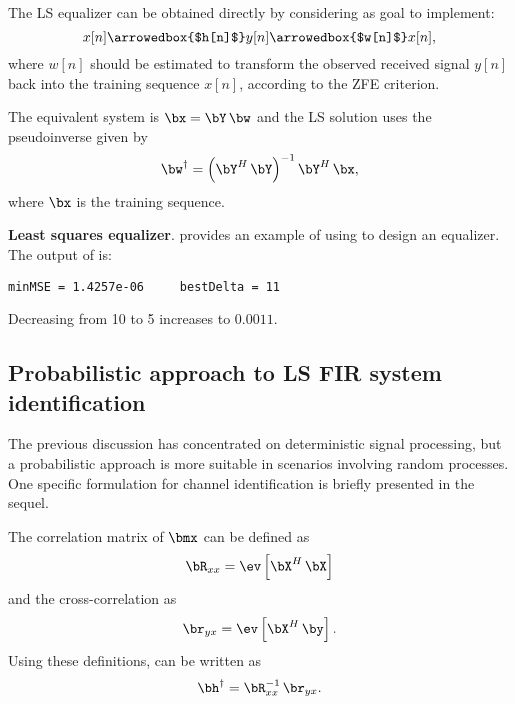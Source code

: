 The LS equalizer can be obtained directly by considering as goal to implement:
\begin{equation}
x[n] \arrowedbox{$h[n]$} y[n] \arrowedbox{$w[n]$} x[n],
\end{equation}
where $w[n]$ should be estimated to transform the observed received signal $y[n]$ back into the training sequence $x[n]$, according to the ZFE criterion.

The equivalent system is $\bx = \bY \, \bw$ and 
the LS solution uses the pseudoinverse given by
\begin{equation}
{\bw^\dag} = \left( \bY^H \, \bY \right)^{-1}  \bY^H \,  \bx,
\label{eq:equalizer_direct_solution}
\end{equation}
where $\bx$ is the training sequence.

\bExample \textbf{Least squares equalizer}.
 provides an example of using  to design an equalizer.
The output of  is:
\begin{verbatim}
minMSE = 1.4257e-06     bestDelta = 11
\end{verbatim}
Decreasing  from 10 to 5 increases  to $0.0011$.
\eExample




\subsection{Probabilistic approach to LS FIR system identification}

The previous discussion has concentrated on deterministic signal processing, but
a probabilistic approach is more suitable in scenarios involving random processes. One
specific formulation for channel identification is briefly presented in the sequel.

The correlation matrix of $\bmx$ can be defined as
\begin{equation}
\bR_{xx} = \ev \left[ \bX^H \, \bX \right]
\label{eq:correlationMatrixRx}
\end{equation}
and the cross-correlation as
\begin{equation}
\br_{yx} = \ev \left[ \bX^H \, \by \right].
\label{eq:crosscorrelationRxy}
\end{equation}
Using these definitions,  can be written as
\begin{equation}
{\bh}^\dag = \bR_{xx}^{-1}  \, \br_{yx}.
\label{eq:ls_solution_correlationNotation}
\end{equation}

